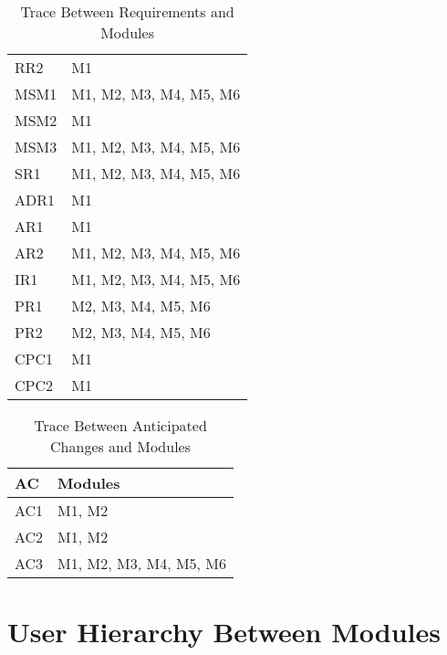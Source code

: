 \documentclass[12pt, titlepage]{article}
\begin{document}
\begin{table}[H]
\begin{tabular}{p{} p{}}
        RR2 & M1 \\
        MSM1 & M1, M2, M3, M4, M5, M6 \\
        MSM2 & M1 \\
        MSM3 & M1, M2, M3, M4, M5, M6 \\
        SR1 & M1, M2, M3, M4, M5, M6 \\
        ADR1 & M1 \\
        AR1 & M1 \\
        AR2 & M1, M2, M3, M4, M5, M6 \\
        IR1 & M1, M2, M3, M4, M5, M6 \\
        PR1 & M2, M3, M4, M5, M6 \\
        PR2 & M2, M3, M4, M5, M6 \\
        CPC1 & M1 \\
        CPC2 & M1 \\
        \bottomrule
    \end{tabular}
    \caption{Trace Between Requirements and Modules}
\end{table}


\begin{table}[H]
    \centering
    \begin{tabular}{p{} p{}}
        \toprule
        \textbf{AC} & \textbf{Modules}\\
        \midrule
            AC1 & M1, M2 \\
            AC2 & M1, M2 \\
            AC3 & M1, M2, M3, M4, M5, M6 \\
        \bottomrule
    \end{tabular}
    \caption{Trace Between Anticipated Changes and Modules}
\end{table}

\section{User Hierarchy Between Modules}
\end{document}
